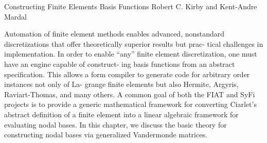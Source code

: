               {Constructing Finite Elements Basis Functions}
              {Robert C. Kirby and Kent-Andre Mardal}

\editornote{[kirby-1]}

Automation of finite element methods enables advanced, nonstandard
discretizations that offer theoretically superior results but prac-
tical challenges in implementation. In order to enable ``any'' finite
element discretization, one must have an engine capable of construct-
ing basis functions from an abstract specification. This allows a form
compiler to generate code for arbitrary order instances not only of
La- grange finite elements but also Hermite, Argyris, Raviart-Thomas,
and many others. A common goal of both the FIAT and SyFi projects is
to provide a generic mathematical framework for converting Ciarlet's
abstract definition of a finite element into a linear algebraic
framework for evaluating nodal bases. In this chapter, we discuss the
basic theory for constructing nodal bases via generalized Vandermonde
matrices.
